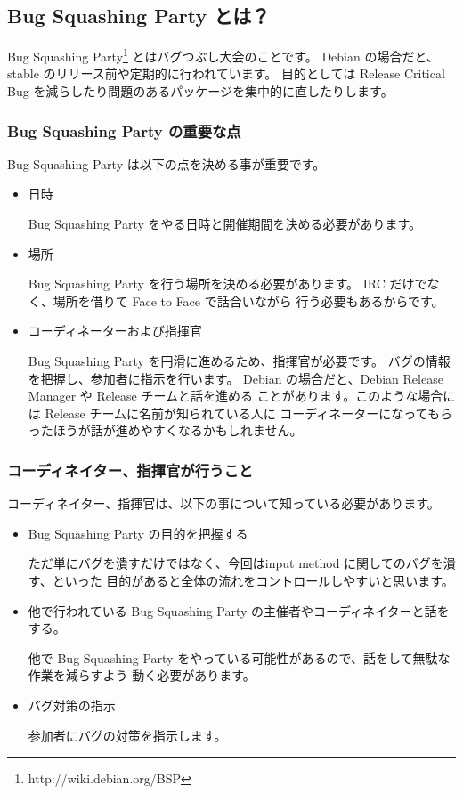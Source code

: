 \documentclass[mingoth,a4paper]{jsarticle}
\begin{document}
\subsection{Bug Squashing Party とは？}
Bug Squashing Party\footnote{http://wiki.debian.org/BSP} とはバグつぶし大会のことです。
Debian の場合だと、stable のリリース前や定期的に行われています。
目的としては Release Critical Bug を減らしたり問題のあるパッケージを集中的に直したりします。

\subsubsection{Bug Squashing Party の重要な点}

Bug Squashing Party は以下の点を決める事が重要です。
\begin{itemize}
	\item 日時

		Bug Squashing Party をやる日時と開催期間を決める必要があります。
	\item 場所

		Bug Squashing Party を行う場所を決める必要があります。
		IRC だけでなく、場所を借りて Face to Face で話合いながら
		行う必要もあるからです。 
	\item コーディネーターおよび指揮官
		
		Bug Squashing Party を円滑に進めるため、指揮官が必要です。
		バグの情報を把握し、参加者に指示を行います。
		Debian の場合だと、Debian Release Manager や Release チームと話を進める
		ことがあります。このような場合には Release チームに名前が知られている人に
		コーディネーターになってもらったほうが話が進めやすくなるかもしれません。
\end{itemize}

\subsubsection{コーディネイター、指揮官が行うこと}
コーディネイター、指揮官は、以下の事について知っている必要があります。
\begin{itemize}
	\item Bug Squashing Party の目的を把握する
		
		ただ単にバグを潰すだけではなく、今回はinput method に関してのバグを潰す、といった
		目的があると全体の流れをコントロールしやすいと思います。

	\item 他で行われている Bug Squashing Party の主催者やコーディネイターと話をする。

		他で Bug Squashing Party をやっている可能性があるので、話をして無駄な作業を減らすよう
		動く必要があります。

	\item バグ対策の指示

		参加者にバグの対策を指示します。
		
\end{itemize}
\end{document}
